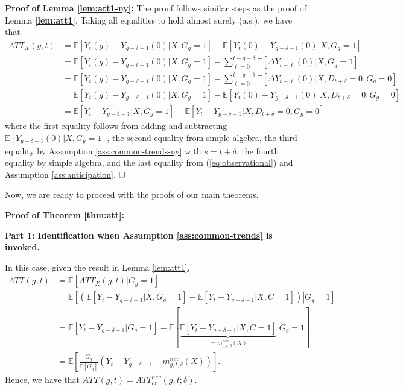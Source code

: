 \documentclass[11pt]{article}%
\theoremstyle{plain}
\numberwithin{sassumption}{section}
\numberwithin{equation}{section}
\begin{document}
{\small \noindent\textbf{Proof of Lemma \ref{lem:att1-ny}:} The proof follows
similar steps as the proof of Lemma \textbf{\ref{lem:att1}}. Taking all
equalities to hold almost surely (a.s.), we have that
\begin{align*}
ATT_{X}(g,t)  &  =\mathbb{E}[Y_{t}\left(  g\right)  -Y_{g-\delta-1}\left(
0\right)  |X,G_{g}=1]-\mathbb{E}[Y_{t}\left(  0\right)  -Y_{g-\delta-1}\left(
0\right)  |X,G_{g}=1]\\
&  =\mathbb{E}[Y_{t}\left(  g\right)  -Y_{g-\delta-1}\left(  0\right)
|X,G_{g}=1]-\sum_{\ell=0}^{t-g-\delta}\mathbb{E}[\Delta Y_{t-\ell}\left(
0\right)  |X,G_{g}=1]\\
&  =\mathbb{E}[Y_{t}\left(  g\right)  -Y_{g-\delta-1}\left(  0\right)
|X,G_{g}=1]-\sum_{\ell=0}^{t-g-\delta}\mathbb{E}[\Delta Y_{t-\ell}\left(
0\right)  |X,D_{t+\delta}=0,G_{g}=0]\\
&  =\mathbb{E}[Y_{t}\left(  g\right)  -Y_{g-\delta-1}\left(  0\right)
|X,G_{g}=1]-\mathbb{E}[Y_{t}\left(  0\right)  -Y_{g-\delta-1}\left(  0\right)
|X,D_{t+\delta}=0,G_{g}=0]\\
&  =\mathbb{E}[Y_{t}-Y_{g-\delta-1}|X,G_{g}=1]-\mathbb{E}[Y_{t}-Y_{g-\delta
-1}|X,D_{t+\delta}=0,G_{g}=0]
\end{align*}
where the first equality follows from adding and subtracting $\mathbb{E}%
[Y_{g-\delta-1}\left(  0\right)  |X,G_{g}=1]$, the second equality from simple
algebra, the third equality by Assumption \ref{ass:common-trends-ny} with
$s=t+\delta$, the fourth equality by simple algebra, and the last equality from
(\ref{eq:observational}) and Assumption \ref{ass:anticipation}. $\square
\bigskip$ }

{\small Now, we are ready to proceed with the proofs of our main
theorems.\bigskip}

{\small \noindent\textbf{Proof of Theorem \ref{thm:att}:} }

{\small \textbf{Part 1: Identification when Assumption \ref{ass:common-trends}
is invoked. } }

{\small In this case, given the result in Lemma \ref{lem:att1},
\begin{align*}
ATT(g,t)  &  =\mathbb{E}[ATT_{X}(g,t)|G_{g}=1]\\
&  =\mathbb{E}\left[  \left.  \left(  \mathbb{E}[Y_{t}-Y_{g-\delta-1}%
|X,G_{g}=1]-\mathbb{E}[Y_{t}-Y_{g-\delta-1}|X,C=1]\right)  \right\vert
G_{g}=1\right] \\
&  =\mathbb{E}[Y_{t}-Y_{g-\delta-1}|G_{g}=1]-\mathbb{E}\left[
\underset{=m_{g,t,\delta}^{nev}\left(  X\right)  }{\underbrace{\mathbb{E}%
[Y_{t}-Y_{g-\delta-1}|X,C=1]}}|G_{g}=1\right] \\
&  =\mathbb{E}\left[  \frac{G_{g}}{\mathbb{E}\left[  G_{g}\right]  }\left(
Y_{t}-Y_{g-\delta-1}-m_{g,t,\delta}^{nev}\left(  X\right)  \right)  \right]  .
\end{align*}
Hence, we have that $ATT(g,t)=ATT_{or}^{nev}\left(  g,t;\delta\right)  .$ }
\end{document}
